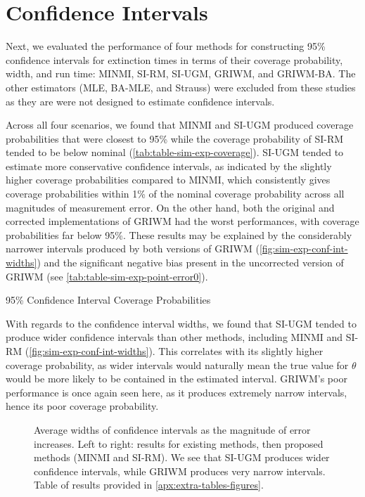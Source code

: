 \section{Confidence Intervals}

Next, we evaluated the performance of four methods for constructing 95\% confidence intervals for extinction times in terms of their coverage probability, width, and run time: MINMI, SI-RM, SI-UGM, GRIWM, and GRIWM-BA. The other estimators (MLE, BA-MLE, and Strauss) were excluded from these studies as they are were not designed to estimate confidence intervals.

Across all four scenarios, we found that MINMI and SI-UGM produced coverage probabilities that were closest to 95\% while the coverage probability of SI-RM tended to be below nominal (\autoref{tab:table-sim-exp-coverage}). SI-UGM tended to estimate more conservative confidence intervals, as indicated by the slightly higher coverage probabilities compared to MINMI, which consistently gives coverage probabilities within 1\% of the nominal coverage probability across all magnitudes of measurement error. On the other hand, both the original and corrected implementations of GRIWM had the worst performances, with coverage probabilities far below 95\%. These results may be explained by the considerably narrower intervals produced by both versions of GRIWM (\autoref{fig:sim-exp-conf-int-widths}) and the significant negative bias present in the uncorrected version of GRIWM (see \autoref{tab:table-sim-exp-point-error0}).
\begin{table}[ht]
    \centering
    \caption{95\% Confidence Interval Coverage Probabilities}
    
    \label{tab:table-sim-exp-coverage}
    \vspace{-4mm}
\end{table}

With regards to the confidence interval widths, we found that SI-UGM tended to produce wider confidence intervals than other methods, including MINMI and SI-RM (\autoref{fig:sim-exp-conf-int-widths}). This correlates with its slightly higher coverage probability, as wider intervals would naturally mean the true value for $\theta$ would be more likely to be contained in the  estimated interval. GRIWM's poor performance is once again seen here, as it produces extremely narrow intervals, hence its poor coverage probability.
\begin{figure}[ht]
    \centering
    
    \caption{Average widths of confidence intervals as the magnitude of error increases. Left to right: results for existing methods, then proposed methods (MINMI and SI-RM). We see that SI-UGM produces wider confidence intervals, while GRIWM produces very narrow intervals. Table of results provided in \autoref{apx:extra-tables-figures}.}
    \label{fig:sim-exp-conf-int-widths}
\end{figure}

